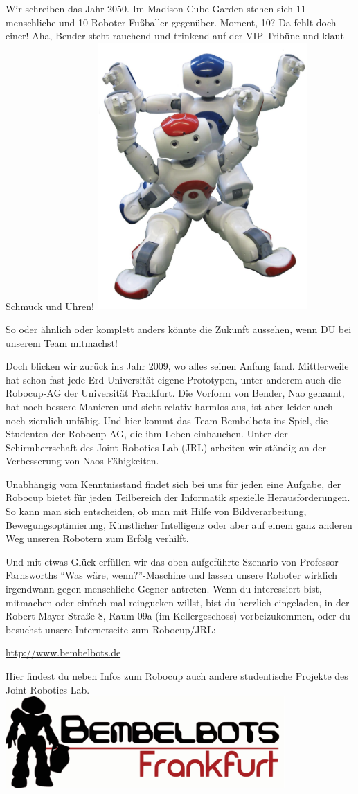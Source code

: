 \spaltenanfang
Wir schreiben das Jahr 2050. Im Madison Cube Garden stehen sich 11 menschliche und 10 Roboter-Fußballer gegenüber. Moment, 10? Da fehlt doch einer! Aha, Bender steht rauchend und trinkend auf der VIP-Tribüne und klaut Schmuck und Uhren!
\includegraphics[width=8cm]{bilder/robocup1}

So oder ähnlich oder komplett anders könnte die Zukunft aussehen, wenn DU bei unserem Team mitmachst!

Doch blicken wir zurück ins Jahr 2009, wo alles seinen Anfang fand. Mittlerweile hat schon fast jede Erd-Universität eigene Prototypen, unter anderem auch die Robocup-AG der Universität Frankfurt. Die Vorform von Bender, Nao genannt, hat noch bessere Manieren und sieht relativ harmlos aus, ist aber leider auch noch ziemlich unfähig. Und hier kommt das Team Bembelbots ins Spiel, die Studenten der Robocup-AG, die ihm Leben einhauchen. Unter der Schirmherrschaft des Joint Robotics Lab (JRL) arbeiten wir ständig an der Verbesserung von Naos Fähigkeiten.

Unabhängig vom Kenntnisstand findet sich bei uns für jeden eine Aufgabe, der Robocup bietet für jeden Teilbereich der Informatik spezielle Herausforderungen. So kann man sich entscheiden, ob man mit Hilfe von Bildverarbeitung, Bewegungsoptimierung, Künstlicher Intelligenz oder aber auf einem ganz anderen Weg unseren Robotern zum Erfolg verhilft.

Und mit etwas Glück erfüllen wir das oben aufgeführte Szenario von Professor Farnsworths ``Was wäre, wenn?''-Maschine und lassen unsere Roboter wirklich irgendwann gegen menschliche Gegner antreten. Wenn du interessiert bist, mitmachen oder einfach mal reingucken willst, bist du herzlich eingeladen, in der Robert-Mayer-Straße 8, Raum 09a (im Kellergeschoss) vorbeizukommen, oder du besuchst unsere Internetseite zum Robocup/JRL:
 
\url{http://www.bembelbots.de}

Hier findest du neben Infos zum Robocup auch andere studentische Projekte des Joint Robotics Lab. 
\spaltenende
\includegraphics[width=0.8\textwidth]{bilder/Bembelbots}
